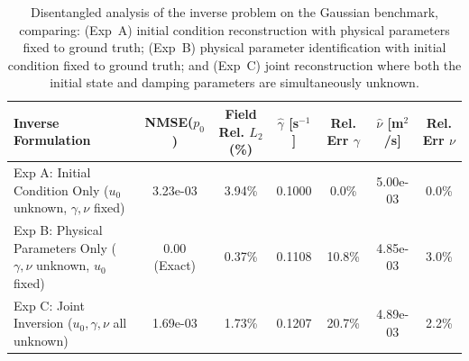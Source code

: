 \begin{table}[H]
\centering
\small
\caption{Disentangled analysis of the inverse problem on the Gaussian benchmark, comparing: (Exp~A) initial condition reconstruction with physical parameters fixed to ground truth; (Exp~B) physical parameter identification with initial condition fixed to ground truth; and (Exp~C) joint reconstruction where both the initial state and damping parameters are simultaneously unknown.}
\label{tab:dpnn_isolated_experiments}
\begin{tabular}{lcccccc}
\toprule
\textbf{Inverse Formulation} & \textbf{NMSE($p_0$)} & \textbf{Field Rel. $L_2$ (\%)} & $\hat{\gamma}$ [s$^{-1}$] & Rel. Err $\gamma$ & $\hat{\nu}$ [m$^2$/s] & Rel. Err $\nu$ \\
\midrule
Exp A: Initial Condition Only ($u_0$ unknown, $\gamma, \nu$ fixed) & 3.23e-03 & 3.94\% & 0.1000 & 0.0\% & 5.00e-03 & 0.0\% \\
Exp B: Physical Parameters Only ($\gamma, \nu$ unknown, $u_0$ fixed) & 0.00 (Exact) & 0.37\% & 0.1108 & 10.8\% & 4.85e-03 & 3.0\% \\
Exp C: Joint Inversion ($u_0, \gamma, \nu$ all unknown) & 1.69e-03 & 1.73\% & 0.1207 & 20.7\% & 4.89e-03 & 2.2\% \\
\bottomrule
\end{tabular}
\end{table}
